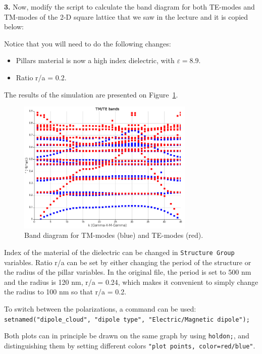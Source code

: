 \documentclass[11pt,a4paper]{article}
\begin{document}
\begin{displayquote}
    \textbf{3.} Now, modify the script to calculate the band diagram for both TE-modes and TM-modes of the 2-D square lattice that we saw in the lecture and it is copied below:
\end{displayquote}

Notice that you will need to do the following changes: 
\begin{itemize}
    \item Pillars material is now a high index dielectric, with $\varepsilon=8.9$. 
    \item Ratio r/a = 0.2.  
\end{itemize}

The results of the simulation are presented on Figure~\ref{fig:tm-te}. 
\begin{figure}[ht]
   \centering
    \includegraphics[width=0.75\textwidth]{tm-te.png}
    \caption{Band diagram for TM-modes (blue) and TE-modes (red).}
    \label{fig:tm-te}
\end{figure}
Index of the material of the dielectric can be changed in \verb|Structure Group| variables. Ratio r/a can be set by either changing the period of the structure or the radius of the pillar variables. In the original file, the period is set to 500 nm and the radius is 120 nm, r/a = 0.24, which makes it convenient to simply change the radius to 100 nm so that r/a = 0.2. 

To switch between the polarizations, a command can be used: \\ 
\verb|setnamed("dipole_cloud", "dipole type", "Electric/Magnetic dipole");|

Both plots can in principle be drawn on the same graph by using \verb|holdon;|, and distinguishing them by setting different colors \verb|"plot points, color=red/blue"|. 
\end{document}
